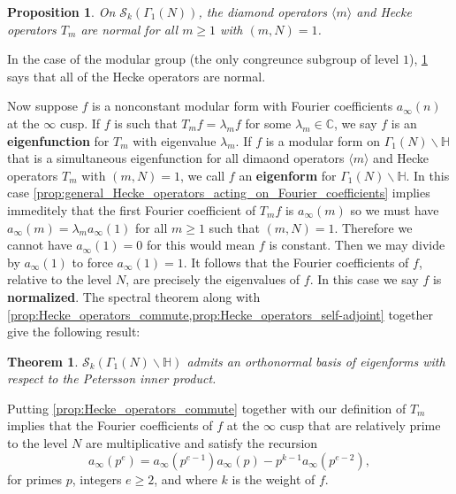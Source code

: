 \documentclass[12pt]{book}
\newtheorem{theorem}{Theorem}[section]
\newtheorem{proposition}{Proposition}[section]
\theoremstyle{definition}\newframedtheorem{method}{Method}
\newcommand{\mc}{\mathcal}
\newcommand{\C}{\mathbb{C}}
\renewcommand{\H}{\mathbb{H}}
\renewcommand{\l}{\lambda}
\newcommand{\G}{\Gamma}
\newcommand{\<}{\langle}
\renewcommand{\>}{\rangle}
\begin{document}
      \begin{proposition}\label{prop:Hecke_operators_self-adjoint}
        On $\mc{S}_{k}(\G_{1}(N))$, the diamond operators $\<m\>$ and Hecke operators $T_{m}$ are normal for all $m \ge 1$ with $(m,N) = 1$.
      \end{proposition}

      In the case of the modular group (the only congreunce subgroup of level $1$), \cref{prop:Hecke_operators_self-adjoint} says that all of the Hecke operators are normal.

      Now suppose $f$ is a nonconstant modular form with Fourier coefficients $a_{\infty}(n)$ at the $\infty$ cusp. If $f$ is such that $T_{m}f = \l_{m}f$ for some $\l_{m} \in \C$, we say $f$ is an \textbf{eigenfunction} for $T_{m}$ with eigenvalue $\l_{m}$. If $f$ is a modular form on $\G_{1}(N)\backslash\H$ that is a simultaneous eigenfunction for all dimaond operators $\<m\>$ and Hecke operators $T_{m}$ with $(m,N) = 1$, we call $f$ an \textbf{eigenform} for $\G_{1}(N)\backslash\H$. In this case \cref{prop:general_Hecke_operators_acting_on_Fourier_coefficients} implies immeditely that the first Fourier coefficient of $T_{m}f$ is $a_{\infty}(m)$ so we must have $a_{\infty}(m) = \l_{m}a_{\infty}(1)$ for all $m \ge 1$ such that $(m,N) = 1$. Therefore we cannot have $a_{\infty}(1) = 0$ for this would mean $f$ is constant. Then we may divide by $a_{\infty}(1)$ to force $a_{\infty}(1) = 1$. It follows that the Fourier coefficients of $f$, relative to the level $N$, are precisely the eigenvalues of $f$. In this case we say $f$ is \textbf{normalized}. The spectral theorem along with \cref{prop:Hecke_operators_commute,prop:Hecke_operators_self-adjoint} together give the following result:

      \begin{theorem}\label{thm:eigenforms_forms_spectral_theory}
        $\mc{S}_{k}(\G_{1}(N)\backslash\H)$ admits an orthonormal basis of eigenforms with respect to the Petersson inner product.
      \end{theorem}

      Putting \cref{prop:Hecke_operators_commute} together with our definition of $T_{m}$ implies that the Fourier coefficients of $f$ at the $\infty$ cusp that are relatively prime to the level $N$ are multiplicative and satisfy the recursion
      \begin{equation}\label{equ:eigenform_Fourier_coefficient_recursion}
        a_{\infty}(p^{e}) = a_{\infty}(p^{e-1})a_{\infty}(p)-p^{k-1}a_{\infty}(p^{e-2}),
      \end{equation}
      for primes $p$, integers $e \ge 2$, and where $k$ is the weight of $f$.
\end{document}
